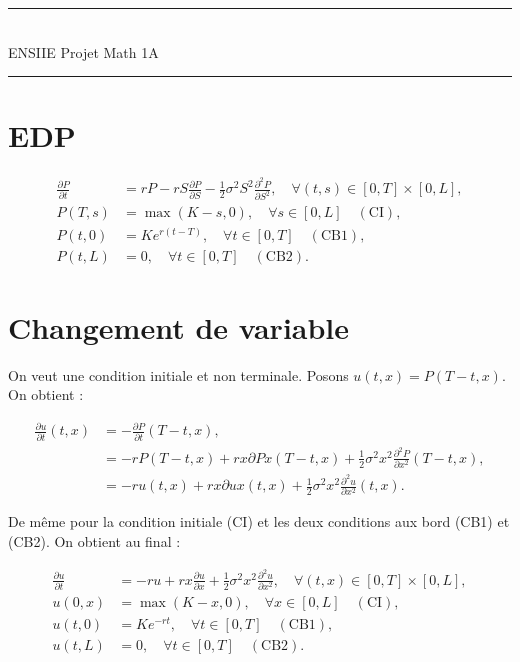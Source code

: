 \documentclass[a4paper, 11pt]{article}
\renewcommand{\(}{\left (}
\renewcommand{\)}{\right )}
\newcommand{\partialx}[2]{\frac{\partial #1}{\partial #2}}
\newcommand{\partialxx}[2]{\frac{\partial^2 #1}{\partial #2^2}}
\begin{document}
\noindent
{\rule{\textwidth}{.2mm}}\\
ENSIIE
\hfill
Projet Math
\hfill
1A\\
{\rule{\textwidth}{.2mm}}

\section{EDP}

\begin{align*}
  \partialx{P}{t} & = rP - rS\partialx{P}{S} -
                    \frac{1}{2}\sigma^2S^2\partialxx{P}{S},
                    \quad\forall (t,s)\in[0,T]\times [0,L], \\
  P(T, s) & = \max(K-s, 0),\quad\forall s\in[0,L]\quad\mathrm{(CI)}, \\
  P(t, 0) & = Ke^{r\(t - T\)},\quad\forall t\in[0,T]\quad\mathrm{(CB1)}, \\
  P(t, L) & = 0,\quad\forall t\in[0,T]\quad\mathrm{(CB2)}.
\end{align*}

\section{Changement de variable}

On veut une condition initiale et non terminale. Posons
$u(t,x) = P(T- t, x)$. On obtient :

\begin{align*}
  \partialx{u}{t}(t, x) & = -\partialx{P}{t}(T - t, x), \\
                        & = -rP(T - t, x) + rx\partial{P}{x}(T - t, x) +
                          \frac{1}{2}\sigma^2x^2\partialxx{P}{x}(T - t, x), \\
                        & = -ru(t, x) + rx\partial{u}{x}(t, x) +
                          \frac{1}{2}\sigma^2x^2\partialxx{u}{x}(t, x).
\end{align*}

De m\^eme pour la condition initiale (CI) et les deux conditions aux
bord (CB1) et (CB2). On obtient au final :

\begin{align*}
  \partialx{u}{t} & = -ru + rx\partialx{u}{x} +
                                  \frac{1}{2}\sigma^2x^2\partialxx{u}{x},
                                  \quad\forall (t,x)\in[0,T]\times [0,L], \\
  u(0, x) & = \max(K - x, 0),\quad\forall x\in[0,L]\quad\mathrm{(CI)}, \\
  u(t, 0) & = Ke^{-rt},\quad\forall t\in[0,T]\quad\mathrm{(CB1)}, \\
  u(t, L) & = 0,\quad\forall t\in[0,T]\quad\mathrm{(CB2)}.
\end{align*}
\end{document}
